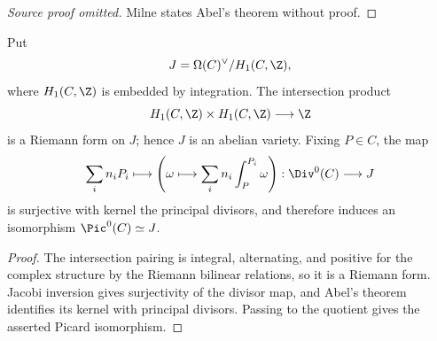 \begin{proof}[Source proof omitted]
Milne states Abel's theorem without proof.
\end{proof}
\begin{theorem}\label{thm:milne-period-jacobian}
Put
\[
J=\Omega(C)^\vee/H_1(C,\Z),
\]
where $H_1(C,\Z)$ is embedded by integration.  The intersection product
\[
H_1(C,\Z)\times H_1(C,\Z)\longrightarrow\Z
\]
is a Riemann form on $J$; hence $J$ is an abelian variety.  Fixing $P\in C$,
the map
\[
\sum_i n_iP_i\longmapsto\left(\omega\longmapsto
\sum_i n_i\int_P^{P_i}\omega\right):\Div^0(C)\longrightarrow J
\]
is surjective with kernel the principal divisors, and therefore induces an
isomorphism $\Pic^0(C)\simeq J$.
\end{theorem}
\begin{proof}
The intersection pairing is integral, alternating, and positive for the
complex structure by the Riemann bilinear relations, so it is a Riemann form.
Jacobi inversion gives surjectivity of the divisor map, and Abel's theorem
identifies its kernel with principal divisors.  Passing to the quotient gives
the asserted Picard isomorphism.
\end{proof}
